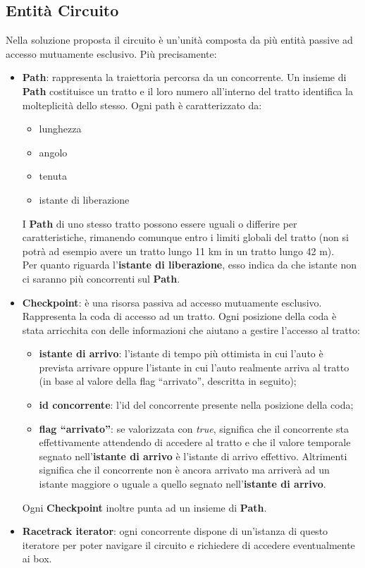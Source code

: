 \label{soluzione_problematiche}
\subsection{Entit\`{a} Circuito}
\label{entita_circuito}
Nella soluzione proposta il circuito è un'unità composta da più entità passive
ad accesso mutuamente esclusivo. Più precisamente:
\begin{itemize}
\item \textbf{Path}: rappresenta la traiettoria percorsa da un concorrente. Un
insieme di \textbf{Path} costituisce un tratto e il loro
numero all'interno del tratto identifica la molteplicità dello stesso. Ogni path
è caratterizzato da:
\begin{itemize}
\item lunghezza
\item angolo
\item tenuta
\item istante di liberazione
\end{itemize}
I \textbf{Path} di uno stesso tratto possono essere uguali o differire per
caratteristiche, rimanendo comunque entro i limiti globali del tratto
(non si potrà ad esempio avere un tratto lungo 11 km in un tratto lungo 42 m).\\
Per quanto riguarda l'\textbf{istante di liberazione}, esso indica da che
istante non ci saranno più concorrenti sul \textbf{Path}.
\item \textbf{Checkpoint}: è una risorsa passiva ad accesso mutuamente
esclusivo. Rappresenta la coda di accesso ad un tratto. Ogni posizione
della coda è stata arricchita con delle informazioni che aiutano a gestire
l'accesso al tratto:
\begin{itemize}
\item \textbf{istante di arrivo}: l'istante di tempo più ottimista in cui l'auto
è prevista arrivare oppure l'istante in cui l'auto realmente
arriva al tratto (in base al valore della flag ``arrivato'', descritta in
seguito);
\item \textbf{id concorrente}: l'id del concorrente presente nella posizione
della coda;
\item \textbf{flag ``arrivato''}: se valorizzata con \emph{true}, significa che
il concorrente sta effettivamente attendendo di accedere al tratto
e che il valore temporale segnato nell'\textbf{istante di arrivo} è l'istante di
arrivo effettivo. Altrimenti significa che il concorrente non
è ancora arrivato ma arriverà ad un istante maggiore o uguale a quello segnato
nell'\textbf{istante di arrivo}.
\end{itemize}
Ogni \textbf{Checkpoint} inoltre punta ad un insieme di \textbf{Path}.
\item \textbf{Racetrack iterator}: ogni concorrente dispone di un'istanza di
questo iteratore per poter navigare il circuito e richiedere
di accedere eventualmente ai box.
\end{itemize}
